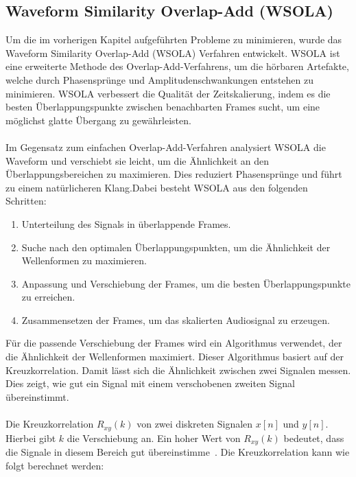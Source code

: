 \subsection{Waveform Similarity Overlap-Add (WSOLA)}
Um die im vorherigen Kapitel aufgeführten Probleme zu minimieren, wurde das Waveform Similarity Overlap-Add (WSOLA) Verfahren entwickelt. WSOLA ist eine erweiterte Methode des Overlap-Add-Verfahrens, um die hörbaren Artefakte, welche durch Phasensprünge und Amplitudenschwankungen entstehen zu minimieren. WSOLA verbessert die Qualität der Zeitskalierung, indem es die besten Überlappungspunkte zwischen benachbarten Frames sucht, um eine möglichst glatte Übergang zu gewährleisten.

\paragraph{}
Im Gegensatz zum einfachen Overlap-Add-Verfahren analysiert WSOLA die Waveform und verschiebt sie leicht, um die Ähnlichkeit an den Überlappungsbereichen zu maximieren. Dies reduziert Phasensprünge und führt zu einem natürlicheren Klang.Dabei besteht WSOLA aus den folgenden Schritten:

\begin{enumerate}
    \item Unterteilung des Signals in überlappende Frames.
    \item Suche nach den optimalen Überlappungspunkten, um die Ähnlichkeit der Wellenformen zu maximieren.
    \item Anpassung und Verschiebung der Frames, um die besten Überlappungspunkte zu erreichen.
    \item Zusammensetzen der Frames, um das skalierten Audiosignal zu erzeugen.
\end{enumerate}

Für die passende Verschiebung der Frames wird ein Algorithmus verwendet, der die Ähnlichkeit der Wellenformen maximiert. Dieser Algorithmus basiert auf der Kreuzkorrelation. Damit lässt sich die Ähnlichkeit zwischen zwei Signalen messen. Dies zeigt, wie gut ein Signal mit einem verschobenen zweiten Signal übereinstimmt.

\paragraph{}
Die Kreuzkorrelation \( R_{xy}(k) \) von zwei diskreten Signalen \( x[n] \) und \( y[n] \). Hierbei gibt \( k \) die Verschiebung an. Ein hoher Wert von \( R_{xy}(k) \) bedeutet, dass die Signale in diesem Bereich gut übereinstimme~\cite{frey2013signal}. Die Kreuzkorrelation kann wie folgt berechnet werden:

